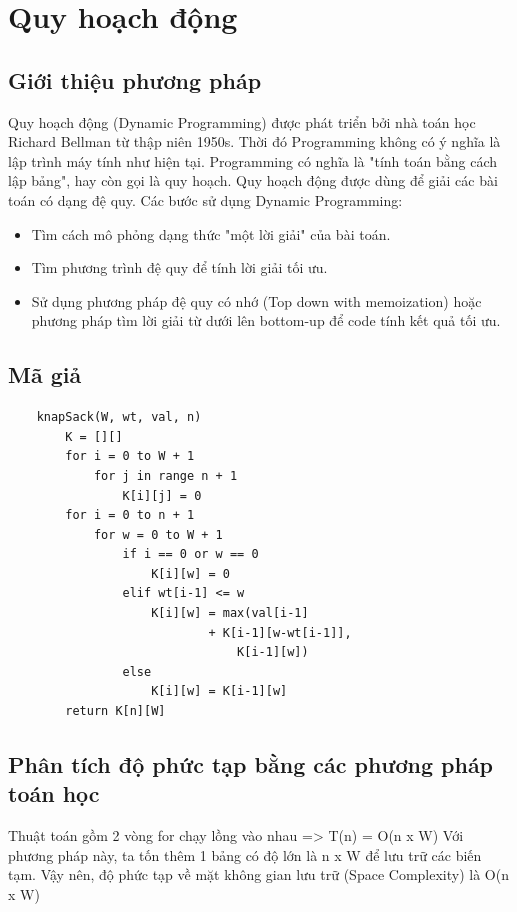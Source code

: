 \documentclass[12pt,a4paper]{report}
\begin{document}
    \section{Quy hoạch động}
    \subsection{Giới thiệu phương pháp}
    Quy hoạch động (Dynamic Programming) được phát triển bởi nhà toán học Richard Bellman từ thập niên 
    1950s. Thời đó Programming không có ý nghĩa là lập trình máy tính như hiện tại.
    Programming có nghĩa là "tính toán bằng cách lập bảng", hay còn gọi là quy hoạch.
    Quy hoạch động được dùng để giải các bài toán có dạng đệ quy.
    Các bước sử dụng Dynamic Programming:
    \begin{itemize}
        \item Tìm cách mô phỏng dạng thức "một lời giải" của bài toán.
        \item Tìm phương trình đệ quy để tính lời giải tối ưu.
        \item Sử dụng phương pháp đệ quy có nhớ (Top down with memoization) hoặc
    phương pháp tìm lời giải từ dưới lên bottom-up để code tính kết quả tối ưu.
    \end{itemize}
    \subsection{Mã giả}
    \begin{lstlisting}
    knapSack(W, wt, val, n)
        K = [][]
        for i = 0 to W + 1
            for j in range n + 1
                K[i][j] = 0
        for i = 0 to n + 1 
            for w = 0 to W + 1 
                if i == 0 or w == 0 
                    K[i][w] = 0
                elif wt[i-1] <= w
                    K[i][w] = max(val[i-1] 
                            + K[i-1][w-wt[i-1]],   
                                K[i-1][w]) 
                else
                    K[i][w] = K[i-1][w] 
        return K[n][W] 
    \end{lstlisting}
    \subsection{Phân tích độ phức tạp bằng các phương pháp toán học}
    Thuật toán gồm 2 vòng for chạy lồng vào nhau => 
    T(n) = O(n x W)
    Với phương pháp này, ta tốn thêm 1 bảng có độ lớn là n x W để lưu trữ các 
    biến tạm. Vậy nên, độ phức tạp về mặt không gian lưu trữ (Space Complexity) là
    O(n x W)
\end{document}
